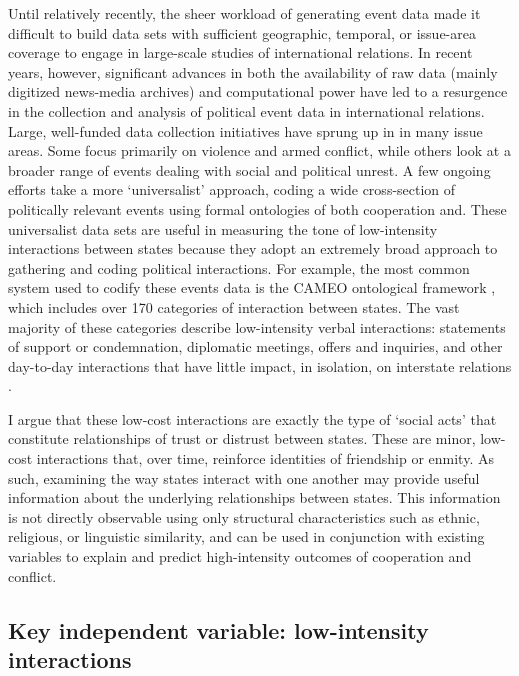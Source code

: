\documentclass[10pt,]{article}
\begin{document}
Until relatively recently, the sheer workload of generating event data
made it difficult to build data sets with sufficient geographic,
temporal, or issue-area coverage to engage in large-scale studies of
international relations. In recent years, however, significant advances
in both the availability of raw data (mainly digitized news-media
archives) and computational power have led to a resurgence in the
collection and analysis of political event data in international
relations. Large, well-funded data collection initiatives have sprung up
in in many issue areas. Some
\citep[e.g.][]{Raleigh2010, Sundberg2013, Chojnacki2012} focus primarily
on violence and armed conflict, while others
\citep[e.g.][]{Salehyan2012, Nardulli2011} look at a broader range of
events dealing with social and political unrest. A few ongoing efforts
\citep{OBrien2010, Schrodt2014} take a more `universalist' approach,
coding a wide cross-section of politically relevant events using formal
ontologies of both cooperation and. These universalist data sets are
useful in measuring the tone of low-intensity interactions between
states because they adopt an extremely broad approach to gathering and
coding political interactions. For example, the most common system used
to codify these events data is the CAMEO ontological framework
\citep{Gerner2009}, which includes over 170 categories of interaction
between states. The vast majority of these categories describe
low-intensity verbal interactions: statements of support or
condemnation, diplomatic meetings, offers and inquiries, and other
day-to-day interactions that have little impact, in isolation, on
interstate relations \citep[90]{OBrien2010}.

I argue that these low-cost interactions are exactly the type of `social
acts' \citep[104]{Kahl1998} that constitute relationships of trust or
distrust between states. These are minor, low-cost interactions that,
over time, reinforce identities of friendship or enmity. As such,
examining the way states interact with one another may provide useful
information about the underlying relationships between states. This
information is not directly observable using only structural
characteristics such as ethnic, religious, or linguistic similarity, and
can be used in conjunction with existing variables to explain and
predict high-intensity outcomes of cooperation and conflict.

\subsection{Key independent variable: low-intensity
interactions}\label{key-independent-variable-low-intensity-interactions}
\end{document}

